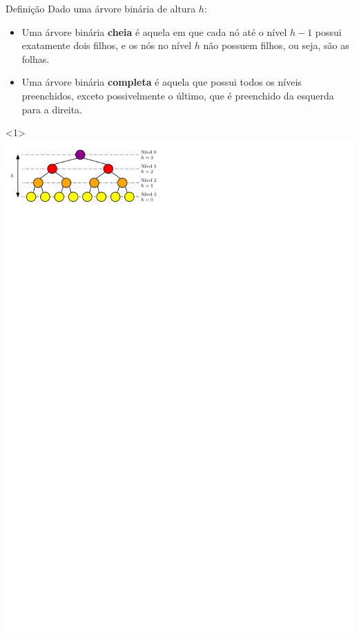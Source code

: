 \documentclass[t, 10pt]{beamer}
\begin{document}
  \begin{frame}{Definição}
    Dado uma árvore binária de altura $h$:
    \begin{itemize}
      \item Uma árvore binária \textbf{cheia} é aquela em que cada
      nó até o nível $h - 1$ possui exatamente dois filhos, e os
      nós no nível $h$ não possuem filhos, ou seja, são as folhas.
      \item<2> Uma árvore binária \textbf{completa} é aquela que possui
      todos os níveis preenchidos, exceto possivelmente o último,
      que é preenchido da esquerda para a direita.
    \end{itemize}

    \begin{center}
      \begin{onlyenv}<1>
        \includegraphics[]{img/img32.pdf}


\end{onlyenv}
\end{center}
\end{frame}
\end{document}
